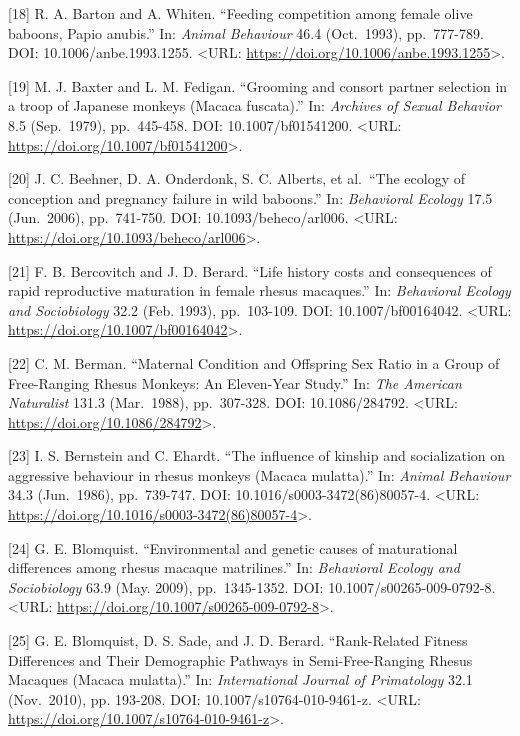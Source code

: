 \documentclass[
]{article}
\begin{document}
{[}18{]} R. A. Barton and A. Whiten. ``Feeding competition among female
olive baboons, Papio anubis.'' In: \emph{Animal Behaviour} 46.4
(Oct.~1993), pp.~777-789. DOI: 10.1006/anbe.1993.1255. \textless URL:
\url{https://doi.org/10.1006/anbe.1993.1255}\textgreater.

{[}19{]} M. J. Baxter and L. M. Fedigan. ``Grooming and consort partner
selection in a troop of Japanese monkeys (Macaca fuscata).'' In:
\emph{Archives of Sexual Behavior} 8.5 (Sep.~1979), pp.~445-458. DOI:
10.1007/bf01541200. \textless URL:
\url{https://doi.org/10.1007/bf01541200}\textgreater.

{[}20{]} J. C. Beehner, D. A. Onderdonk, S. C. Alberts, et al.~``The
ecology of conception and pregnancy failure in wild baboons.'' In:
\emph{Behavioral Ecology} 17.5 (Jun.~2006), pp.~741-750. DOI:
10.1093/beheco/arl006. \textless URL:
\url{https://doi.org/10.1093/beheco/arl006}\textgreater.

{[}21{]} F. B. Bercovitch and J. D. Berard. ``Life history costs and
consequences of rapid reproductive maturation in female rhesus
macaques.'' In: \emph{Behavioral Ecology and Sociobiology} 32.2 (Feb.
1993), pp.~103-109. DOI: 10.1007/bf00164042. \textless URL:
\url{https://doi.org/10.1007/bf00164042}\textgreater.

{[}22{]} C. M. Berman. ``Maternal Condition and Offspring Sex Ratio in a
Group of Free-Ranging Rhesus Monkeys: An Eleven-Year Study.'' In:
\emph{The American Naturalist} 131.3 (Mar.~1988), pp.~307-328. DOI:
10.1086/284792. \textless URL:
\url{https://doi.org/10.1086/284792}\textgreater.

{[}23{]} I. S. Bernstein and C. Ehardt. ``The influence of kinship and
socialization on aggressive behaviour in rhesus monkeys (Macaca
mulatta).'' In: \emph{Animal Behaviour} 34.3 (Jun.~1986), pp.~739-747.
DOI: 10.1016/s0003-3472(86)80057-4. \textless URL:
\url{https://doi.org/10.1016/s0003-3472(86)80057-4}\textgreater.

{[}24{]} G. E. Blomquist. ``Environmental and genetic causes of
maturational differences among rhesus macaque matrilines.'' In:
\emph{Behavioral Ecology and Sociobiology} 63.9 (May. 2009),
pp.~1345-1352. DOI: 10.1007/s00265-009-0792-8. \textless URL:
\url{https://doi.org/10.1007/s00265-009-0792-8}\textgreater.

{[}25{]} G. E. Blomquist, D. S. Sade, and J. D. Berard. ``Rank-Related
Fitness Differences and Their Demographic Pathways in Semi-Free-Ranging
Rhesus Macaques (Macaca mulatta).'' In: \emph{International Journal of
Primatology} 32.1 (Nov.~2010), pp. 193-208. DOI:
10.1007/s10764-010-9461-z. \textless URL:
\url{https://doi.org/10.1007/s10764-010-9461-z}\textgreater.
\end{document}
